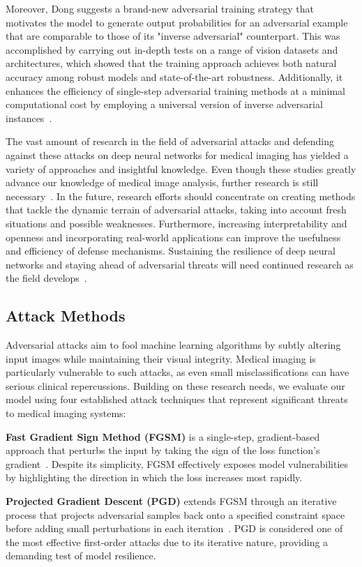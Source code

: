 \documentclass[preprint,12pt]{elsarticle}
\begin{document}
Moreover, Dong suggests a brand-new adversarial training strategy that motivates the model to generate output probabilities for an adversarial example that are comparable to those of its "inverse adversarial" counterpart. This was accomplished by carrying out in-depth tests on a range of vision datasets and architectures, which showed that the training approach achieves both natural accuracy among robust models and state-of-the-art robustness. Additionally, it enhances the efficiency of single-step adversarial training methods at a minimal computational cost by employing a universal version of inverse adversarial instances~\cite{Dong24}.

The vast amount of research in the field of adversarial attacks and defending against these attacks on deep neural networks for medical imaging has yielded a variety of approaches and insightful knowledge. Even though these studies greatly advance our knowledge of medical image analysis, further research is still necessary~\cite{Li23}. In the future, research efforts should concentrate on creating methods that tackle the dynamic terrain of adversarial attacks, taking into account fresh situations and possible weaknesses. Furthermore, increasing interpretability and openness and incorporating real-world applications can improve the usefulness and efficiency of defense mechanisms. Sustaining the resilience of deep neural networks and staying ahead of adversarial threats will need continued research as the field develops~\cite{Eli24}.

\subsection{Attack Methods}
Adversarial attacks aim to fool machine learning algorithms by subtly altering input images while maintaining their visual integrity. Medical imaging is particularly vulnerable to such attacks, as even small misclassifications can have serious clinical repercussions. Building on these research needs, we evaluate our model using four established attack techniques that represent significant threats to medical imaging systems:

\textbf{Fast Gradient Sign Method (FGSM)} is a single-step, gradient-based approach that perturbs the input by taking the sign of the loss function's gradient~\cite{Lee21}. Despite its simplicity, FGSM effectively exposes model vulnerabilities by highlighting the direction in which the loss increases most rapidly.

\textbf{Projected Gradient Descent (PGD)} extends FGSM through an iterative process that projects adversarial samples back onto a specified constraint space before adding small perturbations in each iteration~\cite{Deng24}. PGD is considered one of the most effective first-order attacks due to its iterative nature, providing a demanding test of model resilience.
\end{document}
